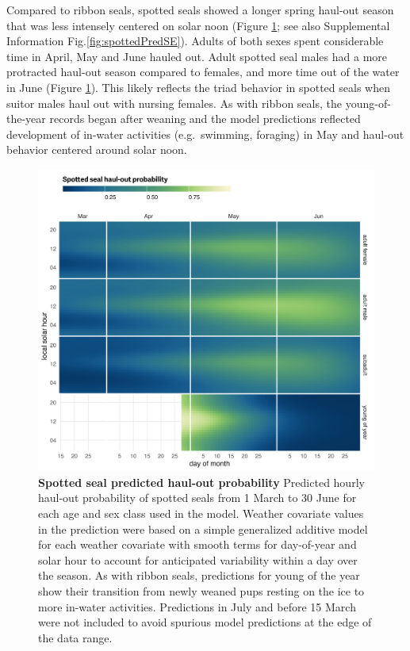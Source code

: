 \documentclass[fleqn,10pt,lineno]{wlpeerj} %
\begin{document}
Compared to ribbon seals, spotted seals showed a longer spring haul-out season
that was less intensely centered on solar noon (Figure \ref{fig:spottedHOCal};
see also Supplemental Information Fig.\ref{fig:spottedPredSE}). Adults of both
sexes spent considerable time in April, May and June hauled out. Adult spotted
seal males had a more protracted haul-out season compared to females, and more
time out of the water in June (Figure \ref{fig:spottedHOCal}). This likely
reflects the triad behavior in spotted seals when suitor males haul out with
nursing females. As with ribbon seals, the young-of-the-year records began after
weaning and the model predictions reflected development of in-water activities
(e.g.~swimming, foraging) in May and haul-out behavior centered around solar
noon.



\begin{figure}
\includegraphics[width=1\linewidth]{../figures/Figure-009} \caption{\textbf{Spotted seal predicted haul-out probability} \linebreak Predicted hourly haul-out probability of spotted seals from 1 March to 30 June for each age and sex class used in the model. Weather covariate values in the prediction were based on a simple generalized additive model for each weather covariate with smooth terms for day-of-year and solar hour to account for anticipated variability within a day over the season. As with ribbon seals, predictions for young of the year show their transition from newly weaned pups resting on the ice to more in-water activities. Predictions in July and before 15 March were not included to avoid spurious model predictions at the edge of the data range.}\label{fig:spottedHOCal}
\end{figure}
\end{document}
